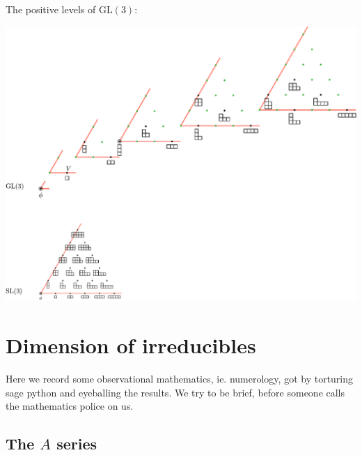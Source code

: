 \documentclass[11pt,oneside]{article}
\newcommand{\GL}{\mathrm{GL}}
\begin{document}
The positive levels of $\GL(3)$:
\begin{center}
\includegraphics[scale=0.6]{images/gl3.pdf}
\end{center}

\section{Dimension of irreducibles}


Here we record some observational mathematics, ie. numerology,
got by torturing sage python and eyeballing the results.
We try to be brief, before someone calls the mathematics police on us.

\subsection{The $A$ series}
\end{document}
